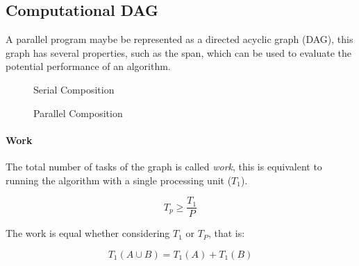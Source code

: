 
\subsection{Computational DAG}

A parallel program maybe be represented as a directed acyclic graph (DAG),
this graph has several properties, such as the span,
which can be used to evaluate the potential performance of an algorithm.

\begin{figure}[h]
    \centering
    \caption{Serial Composition}
    \label{fig:dag:serial}
\end{figure}


\begin{figure}[h]
    \centering
    \caption{Parallel Composition}
    \label{fig:dag:parallel}
\end{figure}

\paragraph{Work}

The total number of tasks of the graph is called \textit{work},
this is equivalent to running the algorithm with a single processing unit ($T_1$).

\begin{equation}\label{eq:work_law}
    T_p \ge \frac{T_1}{P}
\end{equation}

The work is equal whether considering $T_1$ or $T_P$,
that is:

\begin{equation}
    T_1 (A \cup B) = T_1(A) + T_1(B)
\end{equation}

